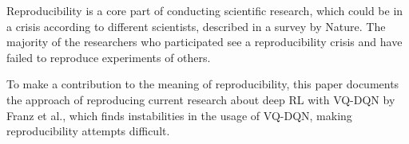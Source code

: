 Reproducibility is a core part of conducting scientific research, which could be in a crisis according to different scientists, described in a survey by Nature.
The majority of the researchers who participated see a reproducibility crisis and have failed to reproduce experiments of others.\autocite{crisis}

To make a contribution to the meaning of reproducibility, this paper documents the approach of reproducing current research about deep \ac{RL} with \ac{VQ-DQN} by Franz et al.\autocite{instabilities}, which finds instabilities in the usage of \ac{VQ-DQN}, making reproducibility attempts difficult.

